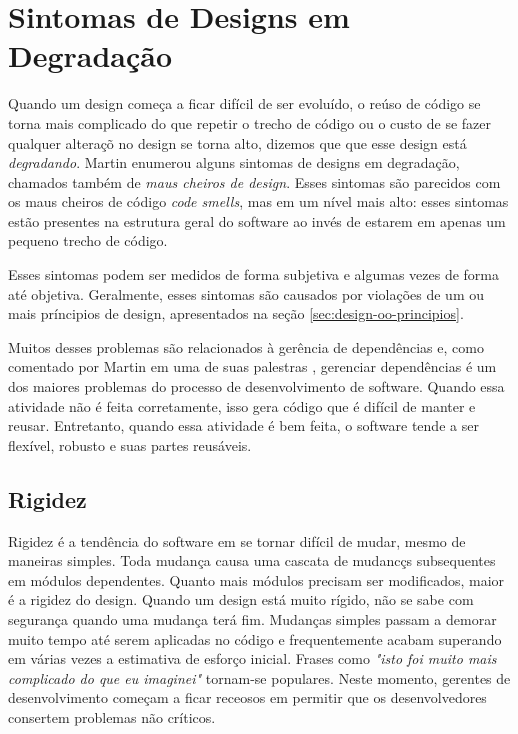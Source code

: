 \section{Sintomas de Designs em Degradação}

Quando um design começa a ficar difícil de ser evoluído, o reúso de código se torna mais complicado do que repetir o trecho de código ou 
o custo de se fazer qualquer alteraçõ no design se torna alto, dizemos que que esse design está \textit{degradando}. 
Martin \cite{bob-martin} enumerou alguns sintomas de designs em degradação, chamados também de \textit{maus cheiros de design}. 
Esses sintomas são parecidos com os maus cheiros de código \textit{code smells}, mas em um nível mais alto: esses sintomas
estão presentes na estrutura geral do software ao invés de estarem em apenas um pequeno trecho de código.

Esses sintomas podem ser medidos de forma subjetiva e algumas vezes de forma até objetiva. Geralmente, esses sintomas são causados
por violações de um ou mais príncipios de design, apresentados na seção \ref{sec:design-oo-principios}. 

Muitos desses problemas são relacionados à gerência de dependências e, como comentado por Martin em
uma de suas palestras \cite{bobmartin-infoq}, gerenciar dependências é um dos maiores problemas do processo de desenvolvimento de software.
Quando essa atividade não é feita corretamente, isso gera código que é difícil de manter e reusar. Entretanto, quando essa atividade
é bem feita, o software tende a ser flexível, robusto e suas partes reusáveis.

\subsection{Rigidez}
\label{subsec:rigidez}

Rigidez é a tendência do software em se tornar difícil de mudar, mesmo de maneiras simples. Toda mudança causa uma cascata de mudancçs subsequentes em módulos dependentes. Quanto mais módulos precisam ser modificados, maior é a rigidez do design. Quando um design está muito rígido, não se sabe com segurança quando uma mudança terá fim. Mudanças simples passam a demorar muito tempo até serem aplicadas no código e frequentemente acabam superando em várias vezes a estimativa de esforço inicial. Frases como \textit{"isto foi muito mais complicado do que eu imaginei"} tornam-se populares. Neste momento, gerentes de desenvolvimento começam a ficar receosos em permitir que os desenvolvedores consertem problemas não críticos.


